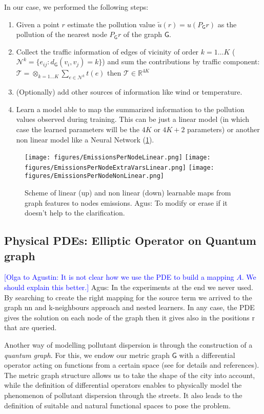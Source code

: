 \documentclass[11pt,a4paper,twoside]{article}
\theoremstyle{definition}
\numberwithin{equation}{section}
\newcommand{\R}{\ensuremath{\mathbb{R}}}
\newcommand{\G}{\ensuremath{\textsf{G}}} %
\newcommand{\<}{\langle}
\renewcommand{\>}{\rangle}
\newcommand{\ascomment}[1]{{\color{teal} Agus: #1}}
\newcommand{\om}[1]{\textcolor{blue}{#1}}
\begin{document}
In our case, we performed the following steps:
\begin{enumerate}
    \item Given a point $r$ estimate the pollution value $\tilde u(r)=u(P_{\G}r)$ as the pollution of the nearest node $P_{\G}r$ of the graph $\G$.
    \item Collect the traffic information of edges of vicinity of order $k=1\dots K$ ($\mathcal{N}^{k}=\{e_{ij}: d_{\G}(v_i, v_j) = k \}$) and sum the contributions by traffic component: $\mathcal{T}=\otimes_{k=1\dots K}\sum_{e \in \mathcal{N}^{k}} t(e)$ then $\mathcal{T} \in \R^{4K}$
    \item (Optionally) add other sources of information like wind or temperature.
    \item Learn a model able to map the summarized information to the pollution values observed during training. This can be just a linear model (in which case the learned parameters will be the $4K$ or $4K+2$ parameters) or another non linear model like a Neural Network (\cref{fig:graph_features}).
\end{enumerate}

\begin{figure}
    \centering
    \texttt{[image: figures/EmissionsPerNodeLinear.png]}
    \texttt{[image: figures/EmissionsPerNodeExtraVarsLinear.png]}
    \texttt{[image: figures/EmissionsPerNodeNonLinear.png]}
    \caption{Scheme of linear (up) and non linear (down) learnable maps from graph features to nodes emissions. \ascomment{To modify or erase if it doesn't help to the clarification.}}
    \label{fig:graph_features}
\end{figure}


\subsection{Physical PDEs: Elliptic Operator on Quantum graph}
\label{sec:PDE}
\om{[Olga to Agustin: It is not clear how we use the PDE to build a mapping $A$. We should explain this better.]}
\ascomment{In the experiments at the end we never used. By searching to create the right mapping for the source term we arrived to the graph nn and k-neighbours approach and nested learners. In any case, the PDE gives the solution on each node of the graph then it gives also in the positions r that are queried.}

Another way of modelling pollutant dispersion is through the construction of a \emph{quantum graph}. For this, we endow our metric graph $\G$ with a differential operator acting on functions from a certain space (see \cite{BK2013} for details and references). The metric graph structure allows us to take the shape of the city into account, while the definition of differential operators enables to physically model the phenomenon of pollutant dispersion through the streets. It also leads to the definition of suitable and natural functional spaces to pose the problem.
\end{document}
